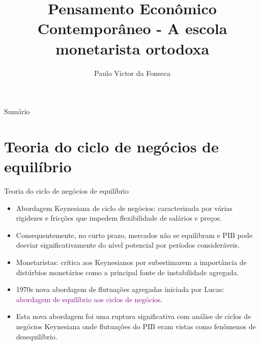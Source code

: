 \documentclass[10pt]{beamer}
\title[]{Pensamento Econômico Contemporâneo - A escola monetarista ortodoxa}
\author[]{Paulo Victor da Fonseca}
\date{}
\begin{document}
\begin{frame}[plain]
\end{frame}

\begin{frame}{Sumário}
    \tableofcontents
\end{frame}

\section{Teoria do ciclo de negócios de equilíbrio}
\begin{frame}{Teoria do ciclo de negócios de equilíbrio}
    \begin{itemize}
        \item Abordagem Keynesiana de ciclo de negócios: caracterizada por várias rigidezes e fricções que impedem flexibilidade de salários e preços.
        \bigskip
        \item Consequentemente, no curto prazo, mercados não se equilibram e PIB pode desviar significativamente do nível potencial por períodos consideráveis.
        \bigskip
        \item Monetaristas: crítica aos Keynesianos por subestimarem a importância de distúrbios monetários como a principal fonte de instabilidade agregada.
        \bigskip
        \item 1970s nova abordagem de flutuações agregadas iniciada por Lucas: \textcolor{purple}{abordagem de equilíbrio aos ciclos de negócios}.
        \bigskip
        \item Esta nova abordagem foi uma ruptura significativa com análise de ciclos de negócios Keynesiana onde flutuações do PIB eram vistas como fenômenos de desequilíbrio.
    \end{itemize}
\end{frame}
\end{document}
